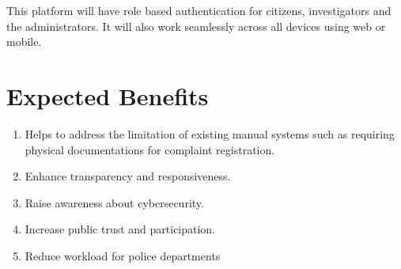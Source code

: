 \documentclass[11pt]{article}
\begin{document}
This platform will have role based authentication for citizens, investigators and the administrators. It will also work seamlessly across all devices using web or mobile.
\section{Expected Benefits}
\label{sec:orgd74327d}
\begin{enumerate}
\item Helps to address the limitation of existing manual systems such as requiring physical documentations for complaint registration.
\item Enhance transparency and responsiveness.
\item Raise awareness about cybersecurity.
\item Increase public trust and participation.
\item Reduce workload for police departments
\end{enumerate}
\end{document}
